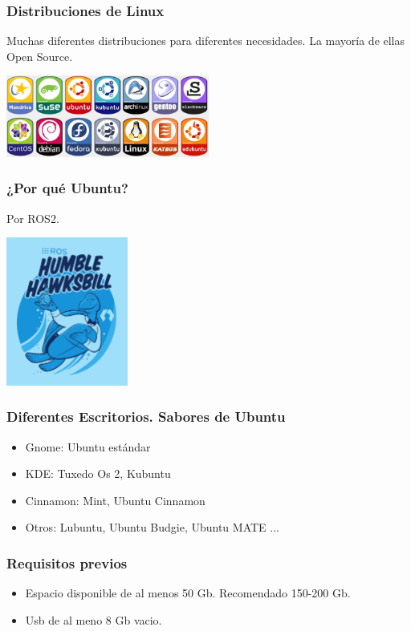 \documentclass[10pt]{beamer}
\begin{document}
	\begin{frame}
		\frametitle{Distribuciones de Linux}
		Muchas diferentes distribuciones para diferentes necesidades. La mayoría de ellas Open Source.\\
		\begin{center}
			\includegraphics[width=0.5\textwidth]{linux_logo}
		\end{center}
	\end{frame}
	
	\begin{frame}
		\frametitle{¿Por qué Ubuntu?}
		Por ROS2.\\
		\begin{center}
			\includegraphics[width=0.3\textwidth]{ros2}
		\end{center}
	\end{frame}
	
	\begin{frame}
		\frametitle{Diferentes Escritorios. Sabores de Ubuntu}
		\begin{itemize}
			\item Gnome: Ubuntu estándar
			\item KDE: Tuxedo Os 2, Kubuntu
			\item Cinnamon: Mint, 
			Ubuntu Cinnamon
			\item Otros: Lubuntu, Ubuntu Budgie, 
			Ubuntu MATE ...
		\end{itemize}
	\end{frame}
	
	\begin{frame}
		\frametitle{Requisitos previos}
		\begin{itemize}
			\item Espacio disponible de al menos 50 Gb. Recomendado 150-200 Gb.
			\item  Usb de al meno 8 Gb vacio.
		\end{itemize}
	\end{frame}
	
\end{document}
